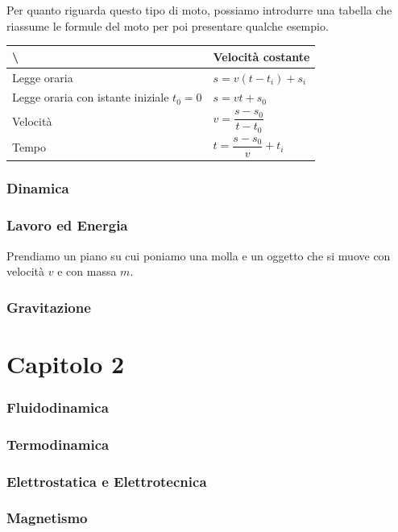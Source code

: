 \documentclass[11pt]{article}
\begin{document}
Per quanto riguarda questo tipo di moto, possiamo introdurre una tabella che riassume le formule del moto per poi presentare qualche esempio.

\begin{table}[H]
\begin{tabular}{l|l}

\textbackslash{}                            & Velocità costante           \\ \hline
Legge oraria                                & $s=v(t-t_i) + s_i$          \\ \hline
Legge oraria con istante iniziale $t_0 = 0$ & $s= vt +s_0$                \\ \hline
Velocità                                    & $v=\dfrac{s-s_0}{t-t_0}$     \\ \hline
Tempo                                       & $ t= \dfrac{s-s_0}{v} + t_i$ \\ 
\end{tabular}
\end{table}

\section{Dinamica}
\section{Lavoro ed Energia}


Prendiamo un piano su cui poniamo una molla e un oggetto che si muove con velocità $v$ e con massa $m$.



\section{Gravitazione}
\part{Capitolo 2}
\section{Fluidodinamica}

\section{Termodinamica}

\section{Elettrostatica e Elettrotecnica}

\section{Magnetismo}
\end{document}
